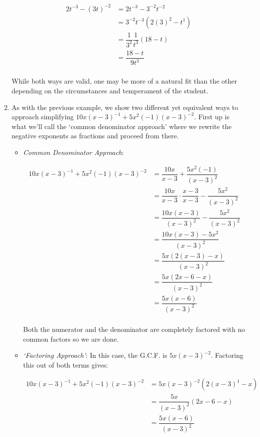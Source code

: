 \begin{ex}
\begin{enumerate}
\begin{align*}
2t^{-3} - (3t)^{-2} & = 2t^{-3} - 3^{-2} t^{-2} \tag{Properties of Exponents} \\ 
& = 3^{-2} t^{-3} (2(3)^2 - t^{1}) \tag{Factor} \\ 
& = \dfrac{1}{3^2} \dfrac{1}{t^3} (18 - t) \tag{Rewrite}\\ 
& = \dfrac{18-t}{9t^3} \tag{Multiply} \\
\end{align*}
																							
While both ways are valid, one may be more of a natural fit than the other depending on the circumstances and temperament of the student.

\item As with the previous example, we show two different yet equivalent ways to approach simplifying $10x(x-3)^{-1} + 5x^2(-1)(x-3)^{-2}$. First up is what we'll call the `common denominator approach' where we rewrite the negative exponents as fractions and proceed from there.

\begin{itemize}

\item  \textit{Common Denominator Approach}:

\begin{align*}
10x(x-3)^{-1} + 5x^2(-1)(x-3)^{-2} & = \dfrac{10x}{x-3} + \dfrac{5x^2(-1)}{(x-3)^2} \\ 
& = \dfrac{10x}{x-3} \cdot \dfrac{x-3}{x-3} - \dfrac{5x^2}{(x-3)^2} \tag{Equivalent Fractions} \\ 
& = \dfrac{10x(x-3)}{(x-3)^2} - \dfrac{5x^2}{(x-3)^2} \tag{Multiply} \\ 
& = \dfrac{10x(x-3) - 5x^2}{(x-3)^2} \tag{Subtract} \\ 
& = \dfrac{5x(2(x-3) - x)}{(x-3)^2} \tag{Factor out G.C.F.} \\ 
& = \dfrac{5x(2x-6-x)}{(x-3)^2} \tag{Distribute} \\ 
& = \dfrac{5x(x-6)}{(x-3)^2} \tag{Combine like terms} \\
\end{align*}

Both the numerator and the denominator are completely factored with no common factors so we are done.

\item  \textit{`Factoring Approach'}: In this case, the G.C.F. is $5x(x-3)^{-2}$.  Factoring this out of both terms gives:

\begin{align*}
10x(x-3)^{-1} + 5x^2(-1)(x-3)^{-2} & = 5x(x-3)^{-2}(2(x-3)^{1} - x) \tag{Factor} \\ 
& = \dfrac{5x}{(x-3)^2} (2x-6 - x) \tag{Rewrite, distribute}\\ 
& = \dfrac{5x(x-6)}{(x-3)^2} \tag{Multiply}\\
\end{align*}


\end{itemize}
\end{enumerate}
\end{ex}
